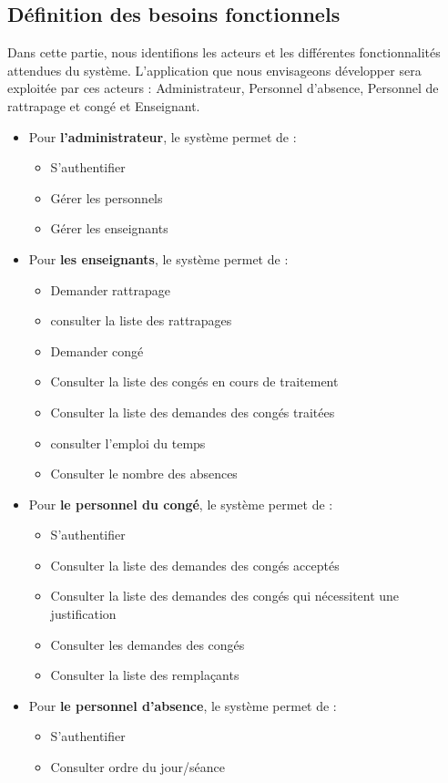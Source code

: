 \documentclass[12 pt]{report}
\begin{document}
\subsection{Définition des besoins fonctionnels}
Dans cette partie, nous identifions les acteurs et les différentes fonctionnalités attendues du système. L’application que nous envisageons développer sera exploitée par ces acteurs : Administrateur, Personnel d’absence, Personnel de rattrapage et congé et Enseignant.
\begin{itemize}[font=\color{black} \Large, label=]
\item  	Pour \textbf{l’administrateur}, le système permet de :
\begin{itemize}[font=\color{black} \Large, label=]
\item S’authentifier
\item Gérer les personnels
\item	Gérer les enseignants
\end{itemize}
\newpage
\item  	Pour \textbf{les enseignants}, le système permet de :
\begin{itemize}[font=\color{black} \Large, label=]
\item 	Demander rattrapage
\item consulter la liste des rattrapages
\item 	Demander congé
\item Consulter la liste des congés en cours de traitement
	\item Consulter la liste des demandes des congés traitées
		
		\item consulter l'emploi du temps

\item Consulter le nombre des absences
\end{itemize}




\item Pour\textbf{ le personnel du congé}, le système permet de : 
\begin{itemize}[font=\color{black} \Large, label=]

\item S’authentifier
\item 	Consulter la liste des demandes des congés acceptés
\item 	Consulter la liste des demandes des congés qui nécessitent une justification
\item Consulter les demandes des congés
\item 	Consulter la liste des remplaçants

\end{itemize}
\item  	Pour \textbf{ le personnel d’absence}, le système permet de : 
\begin{itemize}[font=\color{black} \Large, label=]
\item S’authentifier
\item Consulter ordre du jour/séance

\end{itemize}

\end{itemize}
\newpage
\end{document}
